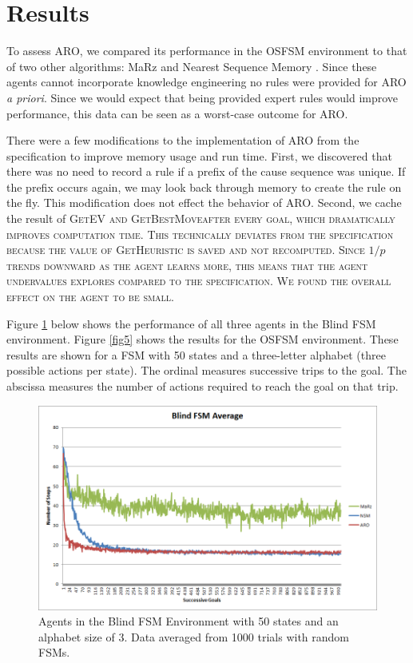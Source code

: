 \documentclass[letterpaper]{article} %
\begin{document}
\section{Results}

To assess ARO, we compared its performance in the OSFSM environment to
that of two other algorithms: MaRz \cite{Rodriguez17} and Nearest
Sequence Memory \cite{McCallum95}. Since these agents cannot incorporate knowledge engineering no rules were provided for ARO \textit{a priori}. Since we would expect that being provided expert rules would improve performance, this data can be seen as a worst-case outcome for ARO.

There were a few modifications to the implementation of ARO from the specification to improve memory usage and run time. First, we discovered that there was no need to record a rule if a prefix of the cause sequence was unique. If the prefix occurs again, we may look back through memory to create the rule on the fly. This modification does not effect the behavior of ARO. Second, we cache the result of \scshape GetEV \normalfont and \scshape GetBestMove\normalfont after every goal, which dramatically improves computation time. This technically deviates from the specification because the value of \scshape GetHeuristic \normalfont is saved and not recomputed. Since $1/p$ trends downward as the agent learns more, this means that the agent undervalues explores compared to the specification. We found the overall effect on the agent to be small.

Figure \ref{fig4} below shows the performance of all three agents in
the Blind FSM environment.  Figure \ref{fig5} shows the results for the OSFSM environment.  These results are shown for a FSM with
50 states and a three-letter alphabet (three possible actions per
state).  The ordinal measures successive trips to the goal.  The
abscissa measures the number of actions required to reach the goal on
that trip.

\begin{figure}[t]
  \centering
  \includegraphics[width=0.9\columnwidth]{BlindFSMGraph.png} %
  \caption{Agents in the Blind FSM Environment with 50 states and an alphabet size of 3. Data averaged from 1000 trials with random FSMs.}
  \label{fig4}
\end{figure}
\end{document}
